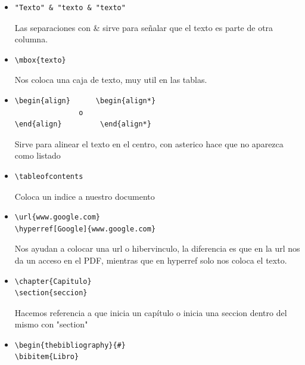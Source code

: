 \documentclass[letterpaper, 12pt, oneside]{article}%
\begin{document}
\begin{enumerate}
\begin{itemize}
\begin{lstlisting}
\end{array}
			\end{lstlisting} Sirve para tabular tablas\\
			
			\begin{lstlisting}  
\hline  o \hline "texto" \hline
			\end{lstlisting}  Dibuja lineas horizontales a nuestra tabla, si se coloca el texto entre dos de esta lineas se cierra la tabla
			\item 
			\begin{lstlisting}  
"Texto" & "texto & "texto"
			\end{lstlisting} Las separaciones con \& sirve para señalar que el texto es parte de otra columna.
			\item
			\begin{lstlisting}  
\mbox{texto}
			\end{lstlisting} Nos coloca una caja de texto, muy util en las tablas.
			\item
			\begin{lstlisting} 
\begin{align}      \begin{align*}
               o     
\end{align}         \end{align*}
			\end{lstlisting} Sirve para alinear el texto en el centro, con asterico hace que no aparezca como listado
			\item
			\begin{lstlisting}  
\tableofcontents
			\end{lstlisting} Coloca un indice a nuestro documento
			\item
			\begin{lstlisting} 
\url{www.google.com}
\hyperref[Google]{www.google.com}			
			\end{lstlisting} Nos ayudan a colocar una url o hibervinculo, la diferencia es que en la url nos da un acceso en el PDF, mientras que en hyperref solo nos coloca el texto.
			\item
			\begin{lstlisting} 
\chapter{Capitulo}
\section{seccion}		
			\end{lstlisting} Hacemos referencia a que inicia un capítulo o  inicia una seccion dentro del mismo con "section"
			\item
			\begin{lstlisting} 
\begin{thebibliography}{#}
\bibitem{Libro}


\end{lstlisting}
\end{itemize}
\end{enumerate}
\end{document}
